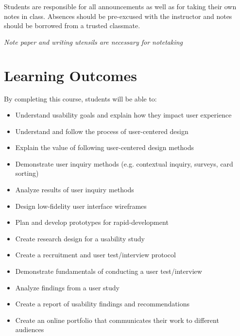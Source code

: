 \documentclass[12pt]{article}
\begin{document}
  Students are responsible for all announcements as well as for taking their own notes in class. Absences should be pre-excused with the instructor and notes should be borrowed from a trusted classmate.

  \textit{Note paper and writing utensils are necessary for notetaking}

  \section*{Learning Outcomes}
  \noindent
  By completing this course, students will be able to:
  \begin{itemize}
    \item Understand usability goals and explain how they impact user experience
    \item Understand and follow the process of user-centered design
    \item Explain the value of following user-centered design methods
    \item Demonstrate user inquiry methods (e.g. contextual inquiry, surveys, card sorting)
    \item Analyze results of user inquiry methods
    \item Design low-fidelity user interface wireframes
    \item Plan and develop prototypes for rapid-development
    \item Create research design for a usability study 
    \item Create a recruitment and user test/interview protocol
    \item Demonstrate fundamentals of conducting a user test/interview
    \item Analyze findings from a user study
    \item Create a report of usability findings and recommendations
    \item Create an online portfolio that communicates their work to different audiences
  \end{itemize}
\end{document}
